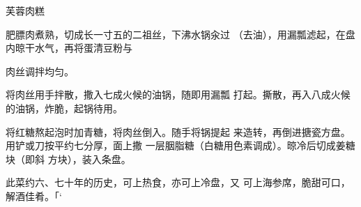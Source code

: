 \begin{recipe}{芙蓉肉糕}

\ingredients


\cooking

\step 肥膘肉煮熟，切成长一寸五的二祖丝，下沸水锅汆过 （去油），用漏瓢滤起，在盘内晾干水气，再将蛋清豆粉与

肉丝调拌均匀。

\step 将肉丝用手拌散，撒入七成火候的油锅，随即用漏瓢 打起。撕散，再入八成火候的油锅，炸脆，起锅待用。

\step 将红糖熬起泡时加青糖，将肉丝倒入。随手将锅提起 来造转，再倒进搪瓷方盘。用铲或刀按平约七分厚，面上撒 一层胭脂糖（白糖用色素调成）。晾冷后切成姜糖块（即斜 方块），装入条盘。

\notes

此菜约六、七十年的历史，可上热食，亦可上冷盘，又 可上海参席，脆甜可口，解酒佳肴。「‘

\end{recipe}


